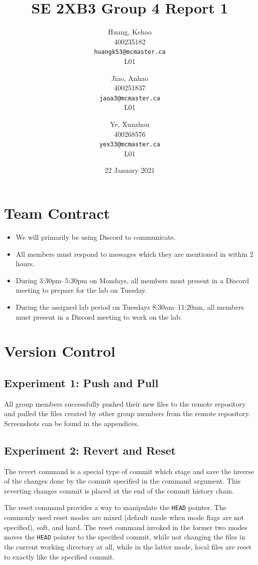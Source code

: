 \documentclass[titlepage, 12pt]{article}
\title{SE 2XB3 Group 4 Report 1}
\author{
  Huang, Kehao \\
  400235182 \\
  \texttt{huangk53@mcmaster.ca} \\
  L01
  \and
  Jiao, Anhao \\
  400251837 \\
  \texttt{jaoa3@mcmaster.ca} \\
  L01
  \and
  Ye, Xunzhou \\
  400268576 \\
  \texttt{yex33@mcmaster.ca} \\
  L01
}
\date{22 January 2021}
\begin{document}
\maketitle{}

\section*{Team Contract}
\label{sec:contract}

\begin{itemize}
\item We will primarily be using Discord to communicate.
\item All members must respond to messages which they are mentioned in within 2
  hours.
\item During 3:30pm--5:30pm on Mondays, all members must present in a Discord
  meeting to prepare for the lab on Tuesday.
\item During the assigned lab period on Tuesdays 8:30am--11:20am, all members
  must present in a Discord meeting to work on the lab.
\end{itemize}

\newpage{}

\section{Version Control}
\label{sec:git}

\subsection{Experiment 1: Push and Pull}
All group members successfully pushed their new files to the remote repository
and pulled the files created by other group members from the remote repository.
Screenshots can be found in the appendices.

\subsection{Experiment 2: Revert and Reset}

The revert command is a special type of commit which stage and save the inverse
of the changes done by the commit specified in the command argument. This
reverting changes commit is placed at the end of the commit history chain.

The reset command provides a way to manipulate the \verb|HEAD| pointer. The
commonly used reset modes are mixed (default mode when mode flags are not
specified), soft, and hard. The reset command invoked in the former two modes
moves the \verb|HEAD| pointer to the specified commit, while not changing the
files in the current working directory at all, while in the latter mode, local
files are reset to exactly like the specified commit.
\end{document}
